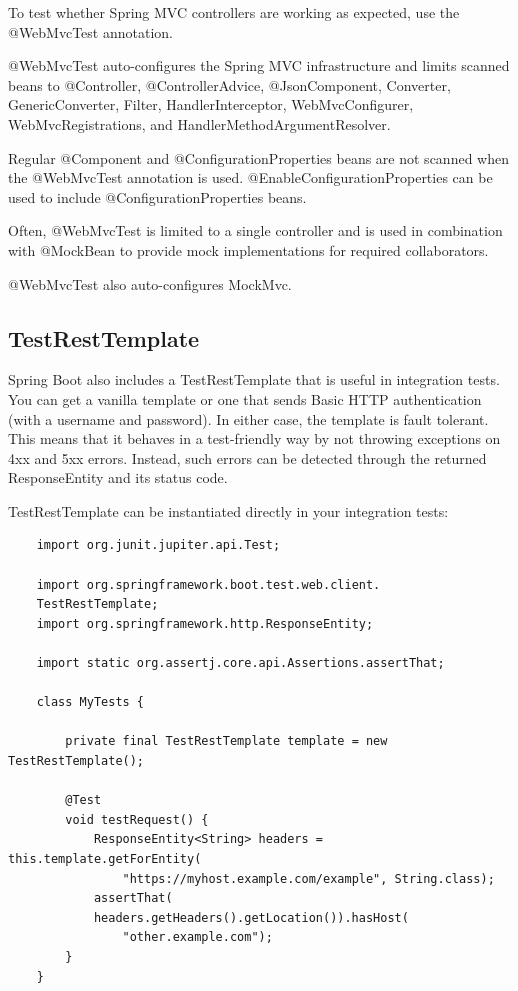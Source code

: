 \documentclass{scrartcl}
\begin{document}
To test whether Spring MVC controllers are working as expected, use the @WebMvcTest annotation.

@WebMvcTest auto-configures the Spring MVC infrastructure and limits scanned beans to @Controller, @ControllerAdvice, @JsonComponent, Converter, GenericConverter, Filter, HandlerInterceptor, WebMvcConfigurer, WebMvcRegistrations, and HandlerMethodArgumentResolver.

Regular @Component and @ConfigurationProperties beans are not scanned when the @WebMvcTest annotation is used. @EnableConfigurationProperties can be used to include @ConfigurationProperties beans.

Often, @WebMvcTest is limited to a single controller and is used in combination with @MockBean to provide mock implementations for required collaborators.

@WebMvcTest also auto-configures MockMvc.

\subsection{TestRestTemplate}

Spring Boot also includes a TestRestTemplate that is useful in integration tests. You can get a vanilla template or one that sends Basic HTTP authentication (with a username and password). In either case, the template is fault tolerant. This means that it behaves in a test-friendly way by not throwing exceptions on 4xx and 5xx errors. Instead, such errors can be detected through the returned ResponseEntity and its status code.

TestRestTemplate can be instantiated directly in your integration tests:

\begin{lstlisting}
    import org.junit.jupiter.api.Test;

    import org.springframework.boot.test.web.client.
    TestRestTemplate;
    import org.springframework.http.ResponseEntity;

    import static org.assertj.core.api.Assertions.assertThat;

    class MyTests {

        private final TestRestTemplate template = new TestRestTemplate();

        @Test
        void testRequest() {
            ResponseEntity<String> headers = this.template.getForEntity(
                "https://myhost.example.com/example", String.class);
            assertThat(
            headers.getHeaders().getLocation()).hasHost(
                "other.example.com");
        }
    }
\end{lstlisting}
\end{document}
